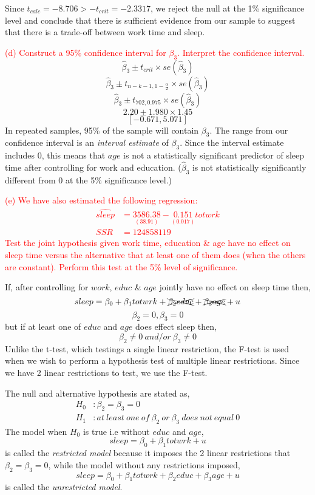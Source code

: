 \documentclass[12pt]{report}
\begin{document}
\noindent Since $t_{calc} = -8.706 > -t_{crit} = -2.3317$, we reject the null at the 1\% significance level and conclude that there is sufficient evidence from our sample to suggest that there is a trade-off between work time and sleep.

\noindent \textcolor{red}{(d) Construct a 95\% confidence interval for $\beta_3$. Interpret the confidence interval.}
$$\hat{\beta}_3 \pm t_{crit} \times se(\hat{\beta}_3)$$
$$\hat{\beta}_3 \pm t_{n-k-1,1-\frac{\alpha}{2}} \times se(\hat{\beta}_3)$$
$$\hat{\beta}_3 \pm t_{702,0.975} \times se(\hat{\beta}_3)$$
$$2.20 \pm 1.980 \times 1.45$$
$$[-0.671,5.071]$$
\noindent In repeated samples, 95\% of the sample will contain $\beta_3$. The range from our confidence interval is an \textit{interval estimate} of $\beta_3$. Since the interval estimate includes $0$, this means that $age$ is not a statistically significant predictor of sleep time after controlling for work and education. ($\hat{\beta}_3$ is not statistically significantly different from 0 at the 5\% significance level.)

\noindent \textcolor{red}{(e) We have also estimated the following regression: \begin{align}
	\widehat{sleep} &= \underset{(38.91)}{3586.38} - \underset{(0.017)}{0.151}totwrk \\
	SSR &= 124858119 \nonumber
	\end{align} Test the joint hypothesis given work time, education \& age have no effect on sleep time versus the alternative that at least one of them does (when the others are constant). Perform this test at the 5\% level of significance.}

\noindent \noindent If, after controlling for $work$, $educ$ \& $age$ jointly have no effect on sleep time then,
$$sleep = \beta_0 + \beta_1 totwrk + \xcancel{\beta_2 educ} + \xcancel{\beta_3 age} + u$$
$$\beta_2 = 0, \beta_3 = 0$$ 
\noindent but if at least one of $educ$ and $age$ does effect sleep then,
$$\beta_2 \neq 0\ and/or\ \beta_3 \neq 0$$ Unlike the t-test, which testings a single linear restriction, the F-test is used when we wish to perform a hypothesis test of multiple linear restrictions. Since we have 2 linear restrictions to test, we use the F-test.

\noindent The null and alternative hypothesis are stated as, \begin{align*}
	H_0&: \beta_2 = \beta_3 = 0 \\
	H_1&: at\ least\ one\ of\ \beta_2\ or\ \beta_3\ does\ not\ equal\ 0
\end{align*} The model when $H_0$ is true i.e without $educ$ and $age$, $$sleep = \beta_0 + \beta_1 totwrk + u$$ is called the \textit{restricted model} because it imposes the 2 linear restrictions that $\beta_2 = \beta_3 = 0$, while the model without any restrictions imposed, $$sleep = \beta_0 + \beta_1 totwrk + \beta_2 educ + \beta_3 age + u$$ is called the \textit{unrestricted model}.
\end{document}

